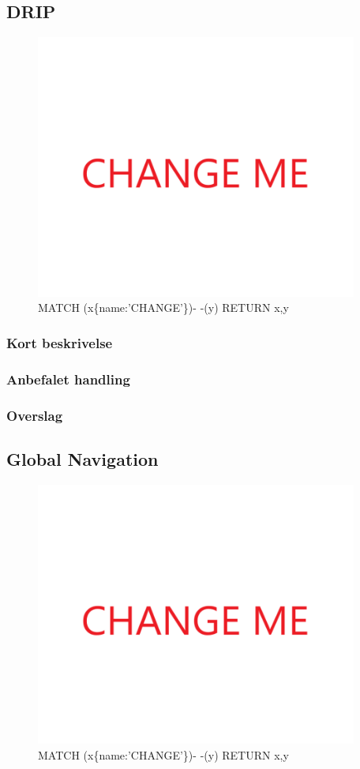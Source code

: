 \documentclass{article}
\begin{document}
\subsection{DRIP}
\begin{figure}[h]
\includegraphics[width=300pt]{CHANGE.PNG}
\caption{MATCH (x\{name:'CHANGE'\})- -(y) RETURN x,y}
\end{figure}
\subsubsection{Kort beskrivelse}
\subsubsection{Anbefalet handling}
\subsubsection{Overslag}
\subsection{Global Navigation}
\begin{figure}[h]
\includegraphics[width=300pt]{CHANGE.PNG}
\caption{MATCH (x\{name:'CHANGE'\})- -(y) RETURN x,y}
\end{figure}
\end{document}
